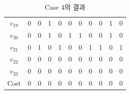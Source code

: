 \documentclass{article}
\begin{document}
\begin{table}[htb!]
\begin{minipage}{0.475\linewidth}
\begin{tabular}{c | c c c c c c c c c c}
        $v_{19}$ & 0 & 0 & 1 & 0 & 0 & 0 & 0 & 0 & 1 & 0 \\
        $v_{20}$ & 0 & 0 & 1 & 0 & 1 & 1 & 0 & 0 & 1 & 0 \\
        $v_{21}$ & 0 & 1 & 0 & 1 & 0 & 0 & 1 & 1 & 0 & 1 \\
        $v_{22}$ & 0 & 0 & 0 & 0 & 0 & 0 & 0 & 0 & 0 & 0 \\
        $v_{23}$ & 0 & 0 & 0 & 0 & 0 & 0 & 0 & 0 & 0 & 0 \\
        \hline
        Cost & 0 & 0 & 0 & 0 & 0 & 0 & 0 & 0 & 0 & 0 \\
        \hline
    \end{tabular}
    \caption{Case 4의 결과}
    \label{tab:result4}
    \end{minipage}
    \end{table}
\end{document}
